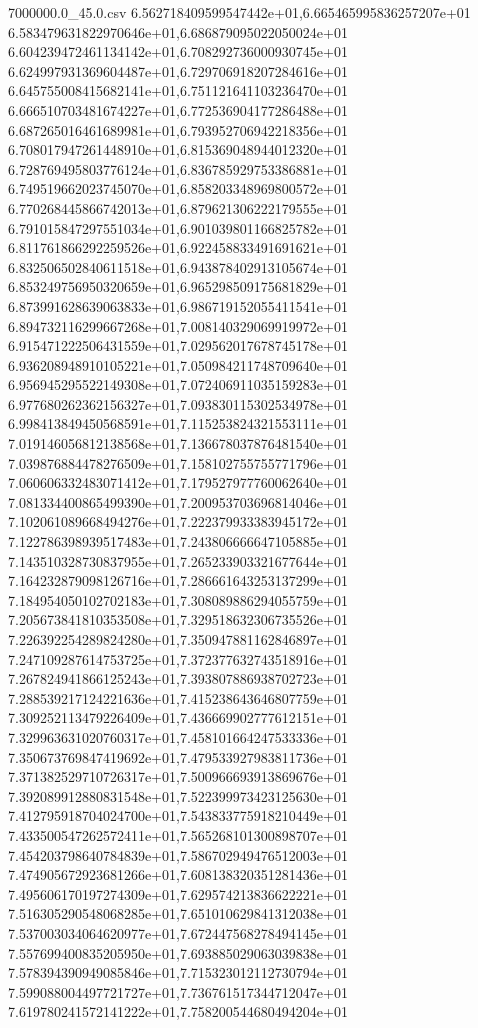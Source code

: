\begin{filecontents*}{7000000.0_45.0.csv}
6.562718409599547442e+01,6.665465995836257207e+01
6.583479631822970646e+01,6.686879095022050024e+01
6.604239472461134142e+01,6.708292736000930745e+01
6.624997931369604487e+01,6.729706918207284616e+01
6.645755008415682141e+01,6.751121641103236470e+01
6.666510703481674227e+01,6.772536904177286488e+01
6.687265016461689981e+01,6.793952706942218356e+01
6.708017947261448910e+01,6.815369048944012320e+01
6.728769495803776124e+01,6.836785929753386881e+01
6.749519662023745070e+01,6.858203348969800572e+01
6.770268445866742013e+01,6.879621306222179555e+01
6.791015847297551034e+01,6.901039801166825782e+01
6.811761866292259526e+01,6.922458833491691621e+01
6.832506502840611518e+01,6.943878402913105674e+01
6.853249756950320659e+01,6.965298509175681829e+01
6.873991628639063833e+01,6.986719152055411541e+01
6.894732116299667268e+01,7.008140329069919972e+01
6.915471222506431559e+01,7.029562017678745178e+01
6.936208948910105221e+01,7.050984211748709640e+01
6.956945295522149308e+01,7.072406911035159283e+01
6.977680262362156327e+01,7.093830115302534978e+01
6.998413849450568591e+01,7.115253824321553111e+01
7.019146056812138568e+01,7.136678037876481540e+01
7.039876884478276509e+01,7.158102755755771796e+01
7.060606332483071412e+01,7.179527977760062640e+01
7.081334400865499390e+01,7.200953703696814046e+01
7.102061089668494276e+01,7.222379933383945172e+01
7.122786398939517483e+01,7.243806666647105885e+01
7.143510328730837955e+01,7.265233903321677644e+01
7.164232879098126716e+01,7.286661643253137299e+01
7.184954050102702183e+01,7.308089886294055759e+01
7.205673841810353508e+01,7.329518632306735526e+01
7.226392254289824280e+01,7.350947881162846897e+01
7.247109287614753725e+01,7.372377632743518916e+01
7.267824941866125243e+01,7.393807886938702723e+01
7.288539217124221636e+01,7.415238643646807759e+01
7.309252113479226409e+01,7.436669902777612151e+01
7.329963631020760317e+01,7.458101664247533336e+01
7.350673769847419692e+01,7.479533927983811736e+01
7.371382529710726317e+01,7.500966693913869676e+01
7.392089912880831548e+01,7.522399973423125630e+01
7.412795918704024700e+01,7.543833775918210449e+01
7.433500547262572411e+01,7.565268101300898707e+01
7.454203798640784839e+01,7.586702949476512003e+01
7.474905672923681266e+01,7.608138320351281436e+01
7.495606170197274309e+01,7.629574213836622221e+01
7.516305290548068285e+01,7.651010629841312038e+01
7.537003034064620977e+01,7.672447568278494145e+01
7.557699400835205950e+01,7.693885029063039838e+01
7.578394390949085846e+01,7.715323012112730794e+01
7.599088004497721727e+01,7.736761517344712047e+01
7.619780241572141222e+01,7.758200544680494204e+01

\end{filecontents*}
